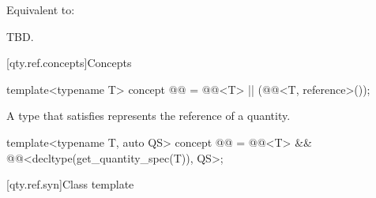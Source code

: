 \begin{itemdescr}
\pnum
\effects
Equivalent to:
\begin{codeblock}
TBD.
\end{codeblock}
\end{itemdescr}

[qty.ref.concepts]{Concepts}

\begin{itemdecl}
template<typename T>
concept @@ = @@<T> || (@@<T, reference>());
\end{itemdecl}

A type  that satisfies 
represents the reference of a quantity.

\begin{itemdecl}
template<typename T, auto QS>
concept @@ = @@<T> && @@<decltype(get_quantity_spec(T{})), QS>;
\end{itemdecl}

[qty.ref.syn]{Class template }

